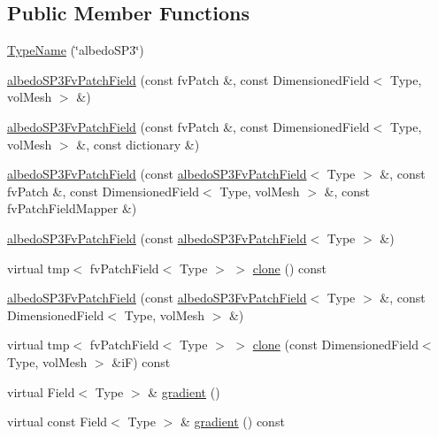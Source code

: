 \subsection*{Public Member Functions}
\begin{DoxyCompactItemize}
\item 
\hyperlink{classFoam_1_1albedoSP3FvPatchField_a80236bacffc8629323b6e1d6366ecb82}{Type\+Name} (\char`\"{}albedo\+S\+P3\char`\"{})
\item 
\hyperlink{classFoam_1_1albedoSP3FvPatchField_a67f6c1e24d954013a2acaf06b6198ebb}{albedo\+S\+P3\+Fv\+Patch\+Field} (const fv\+Patch \&, const Dimensioned\+Field$<$ Type, vol\+Mesh $>$ \&)
\item 
\hyperlink{classFoam_1_1albedoSP3FvPatchField_a003974e3ce4bf2a4e6943a04055a058b}{albedo\+S\+P3\+Fv\+Patch\+Field} (const fv\+Patch \&, const Dimensioned\+Field$<$ Type, vol\+Mesh $>$ \&, const dictionary \&)
\item 
\hyperlink{classFoam_1_1albedoSP3FvPatchField_acd2c52e04588297ab4ce4ce7d14fcca2}{albedo\+S\+P3\+Fv\+Patch\+Field} (const \hyperlink{classFoam_1_1albedoSP3FvPatchField}{albedo\+S\+P3\+Fv\+Patch\+Field}$<$ Type $>$ \&, const fv\+Patch \&, const Dimensioned\+Field$<$ Type, vol\+Mesh $>$ \&, const fv\+Patch\+Field\+Mapper \&)
\item 
\hyperlink{classFoam_1_1albedoSP3FvPatchField_acf8954606fc8580f8a51ef54d1e30e46}{albedo\+S\+P3\+Fv\+Patch\+Field} (const \hyperlink{classFoam_1_1albedoSP3FvPatchField}{albedo\+S\+P3\+Fv\+Patch\+Field}$<$ Type $>$ \&)
\item 
virtual tmp$<$ fv\+Patch\+Field$<$ Type $>$ $>$ \hyperlink{classFoam_1_1albedoSP3FvPatchField_a3b748d8418dd1e3ff70b8749bab69840}{clone} () const
\item 
\hyperlink{classFoam_1_1albedoSP3FvPatchField_ab62a11455223e3152d724f2acb552b77}{albedo\+S\+P3\+Fv\+Patch\+Field} (const \hyperlink{classFoam_1_1albedoSP3FvPatchField}{albedo\+S\+P3\+Fv\+Patch\+Field}$<$ Type $>$ \&, const Dimensioned\+Field$<$ Type, vol\+Mesh $>$ \&)
\item 
virtual tmp$<$ fv\+Patch\+Field$<$ Type $>$ $>$ \hyperlink{classFoam_1_1albedoSP3FvPatchField_a6dfbb046cc414bcb0ee27a1646815537}{clone} (const Dimensioned\+Field$<$ Type, vol\+Mesh $>$ \&iF) const
\item 
virtual Field$<$ Type $>$ \& \hyperlink{classFoam_1_1albedoSP3FvPatchField_abaf3d2e99be0e65d6df55f9437f928f0}{gradient} ()
\item 
virtual const Field$<$ Type $>$ \& \hyperlink{classFoam_1_1albedoSP3FvPatchField_a49573cbf08e58be88ae6f170d04d0d8e}{gradient} () const

\end{DoxyCompactItemize}
